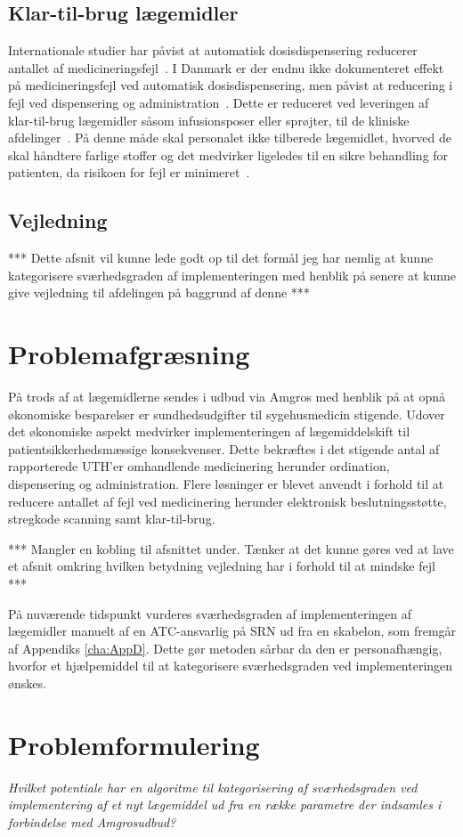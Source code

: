 \subsection{Klar-til-brug lægemidler}
Internationale studier har påvist at automatisk dosisdispensering reducerer antallet af medicineringsfejl~\citep{Oren2003,Sygehusapotekerne2012}. I Danmark er der endnu ikke dokumenteret effekt på medicineringsfejl ved automatisk dosisdispensering, men påvist at reducering i fejl ved dispensering og administration~\citep{Sygehusapotekerne2012}. Dette er reduceret ved leveringen af klar-til-brug lægemidler såsom infusionsposer eller sprøjter, til de kliniske afdelinger~\citep{Sygehusapotekerne2012}. På denne måde skal personalet ikke tilberede lægemidlet, hvorved de skal håndtere farlige stoffer og det medvirker ligeledes til en sikre behandling for patienten, da risikoen for fejl er minimeret~\citep{Amgros2013}. 

\subsection{Vejledning}
*** Dette afsnit vil kunne lede godt op til det formål jeg har nemlig at kunne kategorisere sværhedsgraden af implementeringen med henblik på senere at kunne give vejledning til afdelingen på baggrund af denne ***

\section{Problemafgræsning}
På trods af at lægemidlerne sendes i udbud via Amgros med henblik på at opnå økonomiske besparelser er sundhedsudgifter til sygehusmedicin stigende. Udover det økonomiske aspekt medvirker implementeringen af lægemiddelskift til patientsikkerhedsmæssige konsekvenser. Dette bekræftes i det stigende antal af rapporterede UTH'er omhandlende medicinering herunder ordination, dispensering og administration. Flere løsninger er blevet anvendt i forhold til at reducere antallet af fejl ved medicinering herunder elektronisk beslutningsstøtte, stregkode scanning samt klar-til-brug.

*** Mangler en kobling til afsnittet under. Tænker at det kunne gøres ved at lave et afsnit omkring hvilken betydning vejledning har i forhold til at mindske fejl ***

På nuværende tidspunkt vurderes sværhedsgraden af implementeringen af lægemidler manuelt af en ATC-ansvarlig på SRN ud fra en skabelon, som fremgår af Appendiks \ref{cha:AppD}. Dette gør metoden sårbar da den er personafhængig, hvorfor et hjælpemiddel til at kategorisere sværhedsgraden ved implementeringen ønskes. 

\section{Problemformulering}
\textit{Hvilket potentiale har en algoritme til kategorisering af sværhedsgraden ved implementering af et nyt lægemiddel ud fra en række parametre der indsamles i forbindelse med Amgrosudbud?}
